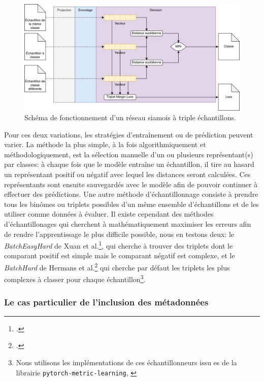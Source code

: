 \begin{figure}[ht]
    \centering
    \includegraphics[width=\linewidth]{figures/chap4/triplet.png}
    \caption{Schéma de fonctionnement d'un réseau siamois à triple échantillons.}
    \label{fig:chap4:reseau:Triplet}
\end{figure}

Pour ces deux variations, les stratégies d'entraînement ou de prédiction peuvent varier. La méthode la plus simple, à la fois algorithmiquement et méthodologiquement, est la sélection manuelle d'un ou plusieurs représentant(s) par classes: à chaque fois que le modèle entraîne un échantillon, il tire au hasard un représentant positif ou négatif avec lequel les distances seront calculées. Ces représentants sont ensuite sauvegardés avec le modèle afin de pouvoir continuer à effectuer des prédictions. Une autre méthode d'échantillonnage consiste à prendre tous les binômes ou triplets possibles d'un même ensemble d'échantillons et de les utiliser comme données à évaluer. Il existe cependant des méthodes d'échantillonages qui cherchent à mathématiquement maximiser les erreurs afin de rendre l'apprentissage le plus difficile possible, nous en testons deux: le \textit{BatchEasyHard} de Xuan et al.\footcite{xuan_improved_2020}, qui cherche à trouver des triplets dont le comparant positif est simple mais le comparant négatif est complexe, et le \textit{BatchHard} de Hermans et al.\footcite{hermans_defense_2017} qui cherche par défaut les triplets les plus complexes à classer pour chaque échantillon\footnote{Nous utilisons les implémentations de ces échantillonneurs issu es de la librairie \texttt{pytorch-metric-learning}, \cite{musgrave2020pytorch}}. 

\subsubsection{Le cas particulier de l'inclusion des métadonnées}
\label{chap4:part2:metadata}

